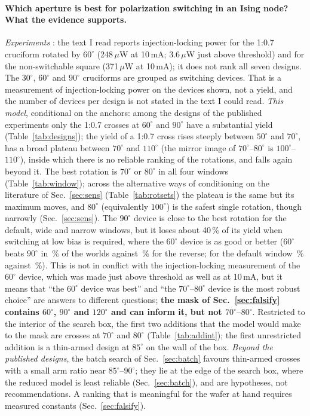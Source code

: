 \paragraph{Which aperture is best for polarization switching in an Ising node? What the evidence supports.}
\emph{Experiments} \cite{yuan2025apl126}: the text I read reports injection-locking power for the 1:0.7 cruciform rotated by $60^\circ$ (248\,$\mu$W at 10\,mA; 3.6\,$\mu$W just above threshold) and for the non-switchable square (371\,$\mu$W at 10\,mA); it does not rank all seven designs. The $30^\circ$, $60^\circ$ and $90^\circ$ cruciforms are grouped as switching devices.
That is a measurement of injection-locking power on the devices shown, not a yield, and the number of devices per design is not stated in the text I could read.
\emph{This model}, conditional on the anchors: among the designs of the published experiments only the 1:0.7 crosses at $60^\circ$ and $90^\circ$ have a substantial yield (Table~\ref{tab:designs}); the yield of a 1:0.7 cross rises steeply between $50^\circ$ and $70^\circ$, has a broad plateau between $70^\circ$ and $110^\circ$ (the mirror image of $70^\circ$--$80^\circ$ is $100^\circ$--$110^\circ$), inside which there is no reliable ranking of the rotations, and falls again beyond it. The best rotation is $70^\circ$ or $80^\circ$ in all four windows (Table~\ref{tab:window}); across the alternative ways of conditioning on the literature of Sec.~\ref{sec:sens} (Table~\ref{tab:rotsets}) the plateau is the same but its maximum moves, and $80^\circ$ (equivalently $100^\circ$) is the safest single rotation, though narrowly (Sec.~\ref{sec:sens}).
The $90^\circ$ device is close to the best rotation for the default, wide and narrow windows, but it loses about 40\,\% of its yield when switching at low bias is required, where the $60^\circ$ device is as good or better ($60^\circ$ beats $90^\circ$ in \lowBiasSixtyBeatsNinety\,\% of the worlds against \lowBiasNinetyBeatsSixty\,\% for the reverse; for the default window \,\% against \,\%).
This is not in conflict with the injection-locking measurement of the $60^\circ$ device, which was made just above threshold as well as at 10\,mA, but it means that ``the $60^\circ$ device was best'' and ``the $70^\circ$--$80^\circ$ device is the most robust choice'' are answers to different questions; \textbf{the mask of Sec.~\ref{sec:falsify} contains $60^\circ$, $90^\circ$ and $120^\circ$ and can inform it, but not $70^\circ$--$80^\circ$}. Restricted to the interior of the search box, the first two additions that the model would make to the mask are crosses at $70^\circ$ and $80^\circ$ (Table~\ref{tab:addint}); the first unrestricted addition is a thin-armed design at $85^\circ$ on the wall of the box.
\emph{Beyond the published designs}, the batch search of Sec.~\ref{sec:batch} favours thin-armed crosses with a small arm ratio near $85^\circ$--$90^\circ$; they lie at the edge of the search box, where the reduced model is least reliable (Sec.~\ref{sec:batch}), and are hypotheses, not recommendations.
A ranking that is meaningful for the wafer at hand requires measured constants (Sec.~\ref{sec:falsify}).

